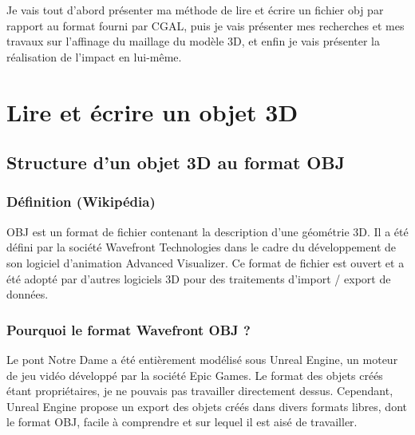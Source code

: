 \documentclass[a4paper,french]{report}
\begin{document}
		Je vais tout d'abord présenter ma méthode de lire et écrire un fichier obj par rapport au format fourni par CGAL, puis je vais présenter mes recherches et mes travaux sur l'affinage du maillage du modèle 3D, et enfin je vais présenter la réalisation de l'impact en lui-même.
		\section{Lire et écrire un objet 3D}
			\subsection{Structure d'un objet 3D au format OBJ}
				\subsubsection{Définition (Wikipédia)}
				OBJ est un format de fichier contenant la description d'une géométrie 3D. Il a été défini par la société Wavefront Technologies dans le cadre du développement de son logiciel d'animation Advanced Visualizer. Ce format de fichier est ouvert et a été adopté par d'autres logiciels 3D pour des traitements d'import / export de données.
				\subsubsection{Pourquoi le format Wavefront OBJ ?}
				Le pont Notre Dame a été entièrement modélisé sous Unreal Engine, un moteur de jeu vidéo développé par la société Epic Games. Le format des objets créés étant propriétaires, je ne pouvais pas travailler directement dessus. Cependant, Unreal Engine propose un export des objets créés dans divers formats libres, dont le format OBJ, facile à comprendre et sur lequel il est aisé de travailler.
\end{document}
